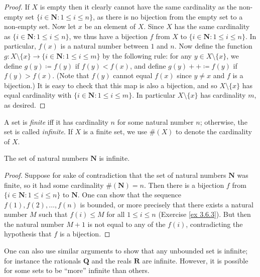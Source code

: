 \begin{proof}
If \(X\) is empty then it clearly cannot have the same cardinality as the non-empty set \(\{i \in \mathbf{N} : 1 \leq i \leq n\}\), as there is no bijection from the empty set to a non-empty set.
Now let \(x\) be an element of \(X\).
Since \(X\) has the same cardinality as \(\{i \in \mathbf{N} : 1 \leq i \leq n\}\), we thus have a bijection \(f\) from \(X\) to \(\{i \in \mathbf{N} : 1 \leq i \leq n\}\).
In particular, \(f(x)\) is a natural number between \(1\) and \(n\).
Now define the function \(g : X \setminus \{x\} \to \{i \in \mathbf{N} : 1 \leq i \leq m\}\) by the following rule: for any \(y \in X \setminus \{x\}\), we define \(g(y) \coloneqq f(y)\) if \(f(y) < f(x)\), and define \(g(y)++ \coloneqq f(y)\) if \(f(y) > f(x)\).
(Note that \(f(y)\) cannot equal \(f(x)\) since \(y \neq x\) and \(f\) is a bijection.)
It is easy to check that this map is also a bijection, and so \(X \setminus \{x\}\) has equal cardinality with \(\{i \in \mathbf{N} : 1 \leq i \leq m\}\).
In particular \(X \setminus \{x\}\) has cardinality \(m\), as desired.
\end{proof}

\begin{definition}\label{3.6.10}
A set is \emph{finite} iff it has cardinality \(n\) for some natural number \(n\);
otherwise, the set is called \emph{infinite}.
If \(X\) is a finite set, we use \(\#(X)\) to denote the cardinality of \(X\).
\end{definition}

\setcounter{theorem}{11}
\begin{theorem}\label{3.6.12}
The set of natural numbers \(\mathbf{N}\) is infinite.
\end{theorem}

\begin{proof}
Suppose for sake of contradiction that the set of natural numbers \(\mathbf{N}\) was finite, so it had some cardinality \(\#(\mathbf{N}) = n\).
Then there is a bijection \(f\) from \(\{i \in \mathbf{N} : 1 \leq i \leq n\}\) to \(\mathbf{N}\).
One can show that the sequence \(f(1), f(2), \dots, f(n)\) is bounded, or more precisely that there exists a natural number \(M\) such that \(f(i) \leq M\) for all \(1 \leq i \leq n\) (Exercise \ref{ex 3.6.3}).
But then the natural number \(M+1\) is not equal to any of the \(f(i)\), contradicting the hypothesis that \(f\) is a bijection.
\end{proof}

\begin{remark}\label{3.6.13}
One can also use similar arguments to show that any unbounded set is infinite;
for instance the rationals \(\mathbf{Q}\) and the reals \(\mathbf{R}\) are infinite.
However, it is possible for some sets to be ``more'' infinite than others.
\end{remark}

